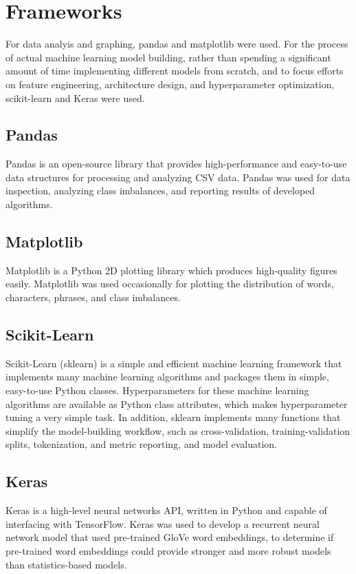 \documentclass{article}
\begin{document}
\section{Frameworks}{
  For data analyis and graphing, pandas\cite{mckinney-proc-scipy-2010}
  and matplotlib\cite{Hunter:2007} were used. For the process of actual
  machine learning model building, rather than spending a significant amount
  of time implementing different models from scratch, and to focus efforts on
  feature engineering, architecture design, and hyperparameter optimization,
  scikit-learn\cite{sklearn_api} and Keras\cite{chollet2015keras} were used.
  \subsection{Pandas}{
	  Pandas is an open-source library that provides high-performance and
	  easy-to-use data structures for processing and analyzing CSV data.
	  Pandas was used for data inspection, analyzing class imbalances, and
	  reporting results of developed algorithms.
  }
  \subsection{Matplotlib}{
	  Matplotlib is a Python 2D plotting library which produces high-quality
	  figures easily. Matplotlib was used occasionally for plotting the
	  distribution of words, characters, phrases, and class imbalances.
  }
  \subsection{Scikit-Learn}{
	  Scikit-Learn (sklearn) is a simple and efficient machine learning framework
	  that implements many machine learning algorithms and packages them in
	  simple, easy-to-use Python classes. Hyperparameters for these machine
	  learning algorithms are available as Python class attributes, which makes
	  hyperparameter tuning a very simple task. In addition, sklearn implements
	  many functions that simplify the model-building workflow, such as
	  cross-validation, training-validation splits, tokenization, and metric
	  reporting, and model evaluation.
  }
  \subsection{Keras}{
	  Keras is a high-level neural networks API, written in Python and capable of
	  interfacing with TensorFlow\cite{tensorflow2015-whitepaper}. Keras was used
	  to develop a recurrent neural network model that used pre-trained GloVe word
	  embeddings\cite{pennington2014glove}, to determine if pre-trained word
	  embeddings could provide stronger and more robust models than
	  statistics-based models.
  }
 }
\end{document}
